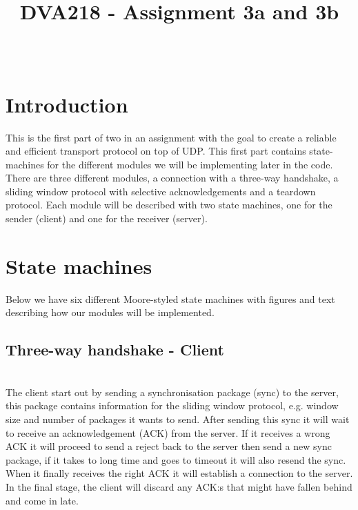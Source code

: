 \documentclass[conference]{IEEEtran}
\begin{document}
\title{DVA218 - Assignment 3a and 3b}
\author{
\and
{}
\and
{}}
\maketitle

${}$\hspace{5em}





\section{Introduction}
This is the first part of two in an assignment with the goal to create a reliable and efficient transport protocol on top of UDP. This first part contains state-machines for the different modules we will be implementing later in the code. There are three different modules, a connection with a three-way handshake, a sliding window protocol with selective acknowledgements and a teardown protocol. Each module will be described with two state machines, one for the sender (client) and one for the receiver (server).

\section{State machines}
Below we have six different Moore-styled state machines with figures and text describing how our modules will be implemented.

\subsection{Three-way handshake - Client}
  

\\
The client start out by sending a synchronisation package (sync) to the server, this package contains information for the sliding window protocol, e.g. window size and number of packages it wants to send. After sending this sync it will wait to receive an acknowledgement (ACK) from the server. If it receives a wrong ACK it will proceed to send a reject back to the server then send a new sync package, if it takes to long time and goes to timeout it will also resend the sync. When it finally receives the right ACK it will establish a connection to the server. In the final stage, the client will discard any ACK:s that might have fallen behind and come in late.  
\end{document}
